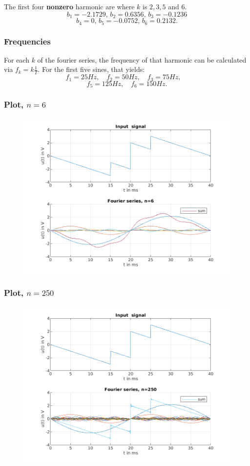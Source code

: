 \documentclass{beamer}
\begin{document}
\begin{frame}
  The first four \textbf{nonzero} harmonic are where $k$ is  $2, 3, 5$ and  $6$.
  \[
    b_{1} = -2.1729, \, b_{2} = 0.6356, \, b_{3} = -0.1236 
  \]
  \[
    b_{4} = 0, \, b_{5} = -0.0752, \, b_{6} = 0.2132
  .\]   
\end{frame}

\begin{frame}
\frametitle{Frequencies}
  For each $k$ of the fourier series, the frequency of that harmonic can be calculated via $f_{k} =
  k \frac{1}{T}$. For the first five sines, that yields:
  \[
    f_{1} = 25Hz, \quad f_{2} = 50Hz, \quad f_{3} = 75Hz, \quad
  \]
  \[
    f_{5} = 125Hz, \quad f_{6} = 150Hz
  .\] 
\end{frame}

\begin{frame}
\frametitle{Plot, $n=6$}
\begin{figure}
  \includegraphics[scale=0.55]{../latex/Figures/fourier_n5.png} 
\end{figure}
\end{frame}

\begin{frame}
\frametitle{Plot, $n=250$}
\begin{figure}
  \includegraphics[scale=0.55]{../latex/Figures/fourier_n250.png} 
\end{figure}
\end{frame}
\end{document}
